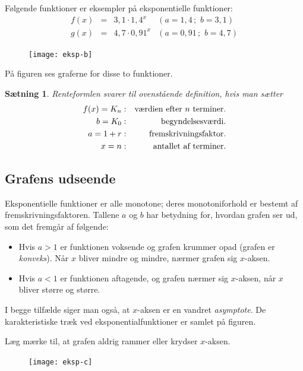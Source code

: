 \documentclass[12pt,oneside,a4paper]{article}
\newcommand{\bas}{\begin{eqnarray*}}
\newcommand{\eas}{\end{eqnarray*}}
\newtheorem{thm}{Sætning}[section]
\begin{document}
Følgende funktioner er eksempler på eksponentielle funktioner:
$$
\begin{array}{rcll}
    f(x) &=& 3,1 \cdot 1,4^x & ( a=1,4  \, ; \, \, b=3,1) \\
    g(x) &=& 4,7 \cdot 0,91^x & (a=0,91 \, ; \, \, b=4,7) 
\end{array}
$$

\begin{figure}[ht]
    \centering
    \texttt{[image: eksp-b]}
    \label{eksp-b}
\end{figure}
På figuren ses graferne for disse to funktioner.

\begin{thm}
    Renteformlen svarer til ovenstående definition, hvis man sætter
    \bas
    f(x) = K_n & : & \hbox{værdien efter $n$ terminer.} \\
       b = K_0 & : & \hbox{begyndelsesværdi.} \\
       a = 1+r & : & \hbox{fremskrivningsfaktor.} \\
       x = n   & : & \hbox{antallet af terminer.}
    \eas
\end{thm}

\subsection{Grafens udseende}
Eksponentielle funktioner er alle monotone; deres monotoniforhold er bestemt af
fremskrivningsfaktoren. Tallene $a$ og $b$ har betydning for, hvordan grafen
ser ud, som det fremgår af følgende:

\begin{itemize}
    \item Hvis $a>1$ er funktionen voksende og grafen krummer opad (grafen
        er {\em konveks}).  Når $x$ bliver mindre og mindre, nærmer grafen
        sig $x$-aksen.
    \item Hvis $a<1$ er funktionen aftagende, og grafen nærmer sig
        $x$-aksen, når $x$ bliver større og større.
\end{itemize}

I begge tilfælde siger man også, at $x$-aksen er en vandret {\em asymptote}.
De karakteristiske træk ved eksponentialfunktioner er samlet på figuren.

Læg mærke til, at grafen aldrig rammer eller krydser $x$-aksen.

\begin{figure}[ht]
    \centering
    \texttt{[image: eksp-c]}
    \label{eksp-c}
\end{figure}
\end{document}
